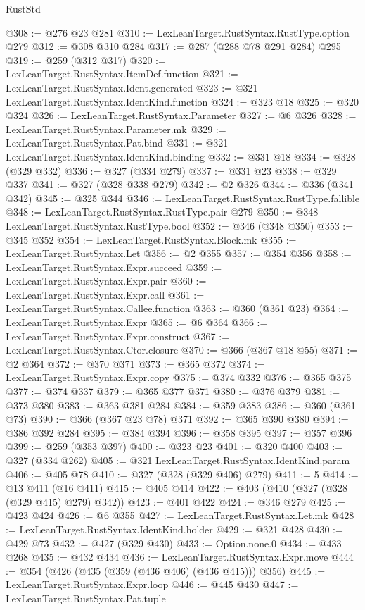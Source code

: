 \begin{lexlean}{RustStd}
\begin{coremodule}
@308 := @276 @23 @281
@310 := LexLeanTarget.RustSyntax.RustType.option @279
@312 := @308 @310 @284
@317 := @287 (@288 @78 @291 @284) @295
@319 := @259 (@312 @317)
@320 := LexLeanTarget.RustSyntax.ItemDef.function
@321 := LexLeanTarget.RustSyntax.Ident.generated
@323 := @321 LexLeanTarget.RustSyntax.IdentKind.function
@324 := @323 @18
@325 := @320 @324
@326 := LexLeanTarget.RustSyntax.Parameter
@327 := @6 @326
@328 := LexLeanTarget.RustSyntax.Parameter.mk
@329 := LexLeanTarget.RustSyntax.Pat.bind
@331 := @321 LexLeanTarget.RustSyntax.IdentKind.binding
@332 := @331 @18
@334 := @328 (@329 @332)
@336 := @327 (@334 @279)
@337 := @331 @23
@338 := @329 @337
@341 := @327 (@328 @338 @279)
@342 := @2 @326
@344 := @336 (@341 @342)
@345 := @325 @344
@346 := LexLeanTarget.RustSyntax.RustType.fallible
@348 := LexLeanTarget.RustSyntax.RustType.pair @279
@350 := @348 LexLeanTarget.RustSyntax.RustType.bool
@352 := @346 (@348 @350)
@353 := @345 @352
@354 := LexLeanTarget.RustSyntax.Block.mk
@355 := LexLeanTarget.RustSyntax.Let
@356 := @2 @355
@357 := @354 @356
@358 := LexLeanTarget.RustSyntax.Expr.succeed
@359 := LexLeanTarget.RustSyntax.Expr.pair
@360 := LexLeanTarget.RustSyntax.Expr.call
@361 := LexLeanTarget.RustSyntax.Callee.function
@363 := @360 (@361 @23)
@364 := LexLeanTarget.RustSyntax.Expr
@365 := @6 @364
@366 := LexLeanTarget.RustSyntax.Expr.construct
@367 := LexLeanTarget.RustSyntax.Ctor.closure
@370 := @366 (@367 @18 @55)
@371 := @2 @364
@372 := @370 @371
@373 := @365 @372
@374 := LexLeanTarget.RustSyntax.Expr.copy
@375 := @374 @332
@376 := @365 @375
@377 := @374 @337
@379 := @365 @377 @371
@380 := @376 @379
@381 := @373 @380
@383 := @363 @381 @284
@384 := @359 @383
@386 := @360 (@361 @73)
@390 := @366 (@367 @23 @78) @371
@392 := @365 @390 @380
@394 := @386 @392 @284
@395 := @384 @394
@396 := @358 @395
@397 := @357 @396
@399 := @259 (@353 @397)
@400 := @323 @23
@401 := @320 @400
@403 := @327 (@334 @262)
@405 := @321 LexLeanTarget.RustSyntax.IdentKind.param
@406 := @405 @78
@410 := @327 (@328 (@329 @406) @279)
@411 := 5
@414 := @13 @411 (@16 @411)
@415 := @405 @414
@422 := @403 (@410 (@327 (@328 (@329 @415) @279) @342))
@423 := @401 @422
@424 := @346 @279
@425 := @423 @424
@426 := @6 @355
@427 := LexLeanTarget.RustSyntax.Let.mk
@428 := LexLeanTarget.RustSyntax.IdentKind.holder
@429 := @321 @428
@430 := @429 @73
@432 := @427 (@329 @430)
@433 := Option.none.{0}
@434 := @433 @268
@435 := @432 @434
@436 := LexLeanTarget.RustSyntax.Expr.move
@444 := @354 (@426 (@435 (@359 (@436 @406) (@436 @415))) @356)
@445 := LexLeanTarget.RustSyntax.Expr.loop
@446 := @445 @430
@447 := LexLeanTarget.RustSyntax.Pat.tuple

\end{coremodule}
\end{lexlean}
